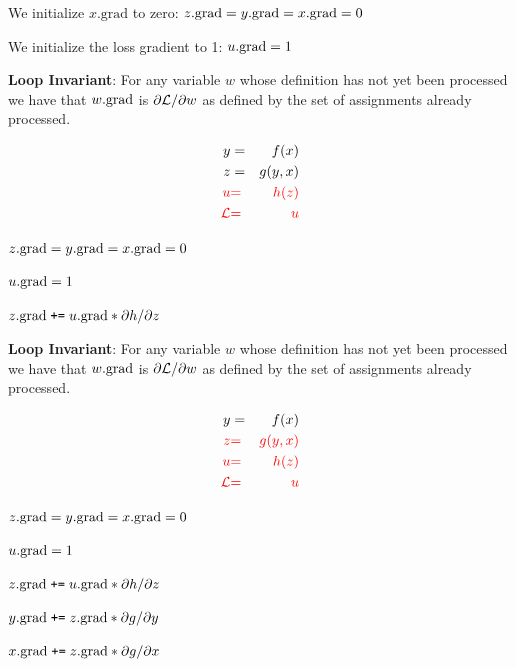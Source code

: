 {\bigskip
We initialize {\color{red} $x.\mathrm{grad}$} to zero: {\color{red} $z.\mathrm{grad} = y.\mathrm{grad} = x.\mathrm{grad} = 0$}

\bigskip
We initialize the loss gradient to 1: {\color{red} $u.\mathrm{grad} = 1$}

\medskip
{\bf Loop Invariant}: For any variable $w$ whose definition has not yet been processed we have that $w.\mathrm{grad}$ is $\partial {\cal L}/\partial w$ as defined by the set of assignments already processed.

\vspace{-3ex}
\begin{eqnarray*}
  y & = & f(x) \\
  z & = & g(y,x) \\
  {\color{red} u} & {\color{red} =} & {\color{red} h(z)} \\
  {\color{red} {\cal L}} & {\color{red}  =} &  {\color{red} u}
\end{eqnarray*}

{\color{red}
\medskip
$z.\mathrm{grad} = y.\mathrm{grad} = x.\mathrm{grad} = 0$

\medskip
$u.\mathrm{grad} = 1$

\medskip
$z.\mathrm{grad}\;\mbox{\tt +=}\; u.\mathrm{grad} * {\partial h}/{\partial z}$

}

\medskip
{\bf Loop Invariant}: For any variable $w$ whose definition has not yet been processed we have that $w.\mathrm{grad}$ is $\partial {\cal L}/\partial w$ as defined by the set of assignments already processed.

\vspace{-3ex}
\begin{eqnarray*}
  y & = & f(x) \\
  {\color{red} z} & {\color{red} =} & {\color{red} g(y,x)} \\
  {\color{red} u} & {\color{red} =} & {\color{red} h(z)} \\
  {\color{red} {\cal L}} & {\color{red} =} & {\color{red}  u}
\end{eqnarray*}

{\color{red}
\medskip
$z.\mathrm{grad} = y.\mathrm{grad} = x.\mathrm{grad} = 0$

\medskip
$u.\mathrm{grad} = 1$

\medskip
$z.\mathrm{grad}\;\mbox{\tt +=}\; u.\mathrm{grad} * {\partial h}/{\partial z}$

\medskip
$y.\mathrm{grad} \;\mbox{\tt +=}\; z.\mathrm{grad} * {\partial g}/{\partial y}$

\medskip
$x.\mathrm{grad} \;\mbox{\tt +=}\; z.\mathrm{grad} * {\partial g}/{\partial x}$

}}
